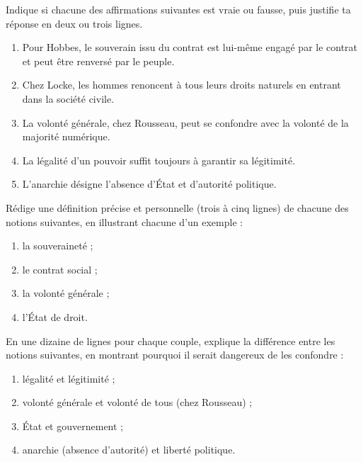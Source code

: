 \documentclass[11pt]{article}
\newcommand{\cle}[1]{{\popxbold\color{popdark}#1}}
\begin{document}
\begin{exercice}
Indique si chacune des affirmations suivantes est vraie ou fausse, puis justifie ta réponse en deux ou trois lignes.

\begin{enumerate}
\item Pour Hobbes, le souverain issu du contrat est lui-même engagé par le contrat et peut être renversé par le peuple.
\item Chez Locke, les hommes renoncent à tous leurs droits naturels en entrant dans la société civile.
\item La volonté générale, chez Rousseau, peut se confondre avec la volonté de la majorité numérique.
\item La légalité d'un pouvoir suffit toujours à garantir sa légitimité.
\item L'anarchie désigne l'absence d'État et d'autorité politique.
\end{enumerate}
\end{exercice}

\begin{exercice}
Rédige une définition précise et personnelle (trois à cinq lignes) de chacune des notions suivantes, en illustrant chacune d'un exemple :
\begin{enumerate}
\item la \cle{souveraineté} ;
\item le \cle{contrat social} ;
\item la \cle{volonté générale} ;
\item l'\cle{État de droit}.
\end{enumerate}
\end{exercice}

\begin{exercice}
En une dizaine de lignes pour chaque couple, explique la différence entre les notions suivantes, en montrant pourquoi il serait dangereux de les confondre :
\begin{enumerate}
\item \cle{légalité} et \cle{légitimité} ;
\item \cle{volonté générale} et \cle{volonté de tous} (chez Rousseau) ;
\item \cle{État} et \cle{gouvernement} ;
\item \cle{anarchie} (absence d'autorité) et \cle{liberté politique}.
\end{enumerate}
\end{exercice}
\end{document}
